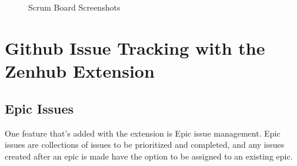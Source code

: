 \documentclass{scrreprt}
\begin{document}
\begin{figure}[ht!]
     \begin{center}
%
        \\%
        \\%
    \end{center}
    \caption{%
        Scrum Board Screenshots
     }%
   \label{fig:subfigures}
\end{figure}

\pagebreak

\section{Github Issue Tracking with the Zenhub Extension}

\subsection{Epic Issues}

One feature that's added with the extension is Epic issue management. Epic issues are collections of issues to be prioritized and completed, and any issues created after an epic is made have the option to be assigned to an existing epic.
\end{document}
